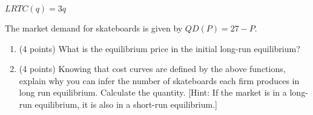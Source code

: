 \documentclass{article}
\begin{document}
$LRTC(q) = 3q$

The market demand for skateboards is given by $QD(P) = 27 - P$.

\begin{enumerate}
  \item (4 points) What is the equilibrium price in the initial long-run equilibrium?
  \item (4 points) Knowing that cost curves are defined by the above functions, explain why you can infer the number of skateboards each firm produces in long run equilibrium. Calculate the quantity. [Hint: If the market is in a long-run equilibrium, it is also in a short-run equilibrium.]
\end{enumerate}

\end{document}
